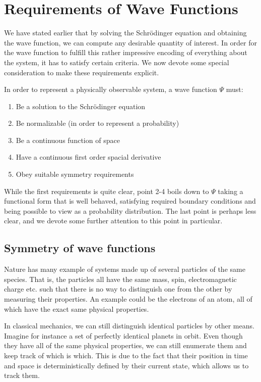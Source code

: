 \documentclass[Thesis.tex]{subfiles}
\begin{document}
\section{Requirements of Wave Functions}\label{sec:requirements-of-wave-functions}

We have stated earlier that by solving the Schrödinger equation and obtaining the wave
function, we can compute any desirable quantity of interest. In order for the wave
function to fulfill this rather impressive encoding of everything about the system, it has
to satisfy certain criteria. We now devote some special consideration to make these
requirements explicit.

In order to represent a physically observable system, a wave function $\Psi$ must:
\begin{enumerate}
    \item Be a solution to the Schrödinger equation 
    \item Be normalizable (in order to represent a probability)
    \item Be a continuous function of space
    \item Have a continuous first order spacial derivative
    \item Obey suitable symmetry requirements
\end{enumerate}
%
While the first requirements is quite clear, point 2-4 boils down to $\Psi$ taking a
functional form that is well behaved, satisfying required boundary conditions and being
possible to view as a probability distribution. The last point is perhaps less clear, and
we devote some further attention to this point in particular.  


\subsection{Symmetry of wave functions}

Nature has many example of systems made up of several particles of the same
species. That is, the particles all have the same mass, spin, electromagnetic
charge etc. such that there is no way to  distinguish one from the other by
measuring their properties. An example could be the electrons of an atom, all of
which have the exact same physical properties.

In classical mechanics, we can still distinguish identical particles by other
means. Imagine for instance a set of perfectly identical planets in orbit. Even
though they have all of the same physical properties, we can still enumerate
them and keep track of which is which. This is due to the fact that their
position in time and space is deterministically defined by their current state,
which allows us to track them.
\end{document}
